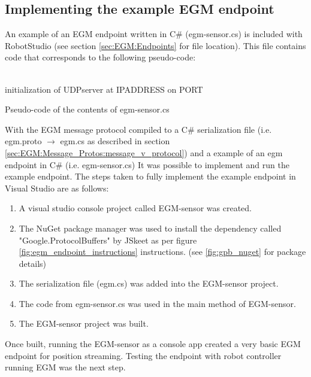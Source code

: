 \documentclass{cslthse-msc}
\begin{document}
\subsection{Implementing the example EGM endpoint}
\label{sec:Dev:I1:ex_endpoint}
An example of an EGM endpoint written in C\# (egm-sensor.cs) is included with RobotStudio (see section \ref{sec:EGM:Endpoints} for file location). This file contains code that corresponds to the following pseudo-code:
\\
\\
\begin{algorithm}[H]
 initialization of UDPserver at IPADDRESS on PORT\;
 \caption{Pseudo-code of the contents of egm-sensor.cs}
\end{algorithm}
$$ $$
With the EGM message protocol compiled to a C\# serialization file (i.e. egm.proto $\rightarrow$ egm.cs as described in section \ref{sec:EGM:Message_Protos:message_v_protocol})  and a example of an egm endpoint in C\# (i.e. egm-sensor.cs) It was possible to implement and run the example endpoint. The steps taken to fully implement the example endpoint in Visual Studio are as follows:
\begin{enumerate}
    \item A visual studio console project called EGM-sensor was created. 
    \item The NuGet package manager was used to install the dependency called "Google.ProtocolBuffers" by JSkeet as per figure \ref{fig:egm_endpoint_instructions} instructions. (see \ref{fig:gpb_nuget} for package details)
    \item The serialization file (egm.cs) was added into the EGM-sensor project.
    \item The code from egm-sensor.cs was used in the main method of EGM-sensor. 
    \item The EGM-sensor project was built.
\end{enumerate}
Once built, running the EGM-sensor as a console app created a very basic EGM endpoint for position streaming. Testing the endpoint with robot controller running EGM was the next step. 
\end{document}
